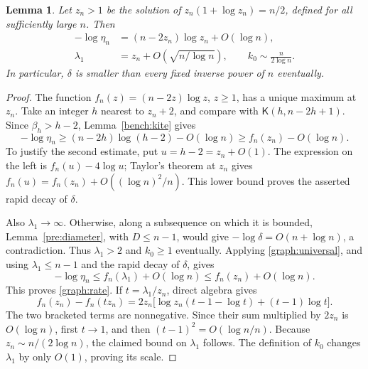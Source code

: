 \documentclass[11pt,a4paper]{article}
\numberwithin{equation}{section}
\newtheorem{lemma}[theorem]{Lemma}
\theoremstyle{definition}
\theoremstyle{remark}
\newcommand{\Kite}{\mathsf{K}}
\begin{document}
\begin{lemma}\label{graph:scale}
Let $z_n>1$ be the solution of $z_n(1+\log z_n)=n/2$, defined for
all sufficiently large $n$. Then
\begin{align}
 -\log\eta_n&=(n-2z_n)\log z_n+O(\log n),\label{graph:rate}\\
 \lambda_1&=z_n+O\!\left(\sqrt{n/\log n}\right),
 \qquad k_0\sim\frac{n}{2\log n}.\label{graph:scale-eq}
\end{align}
In particular, $\delta$ is smaller than every fixed inverse power of $n$
eventually.
\end{lemma}
\begin{proof}
The function $f_n(z)=(n-2z)\log z$, $z\ge1$, has a unique maximum at
$z_n$. Take an integer $h$ nearest to $z_n+2$, and compare with
$\Kite(h,n-2h+1)$. Since $\beta_h>h-2$, Lemma~\ref{bench:kite} gives
\[
 -\log\eta_n\ge(n-2h)\log(h-2)-O(\log n)
 \ge f_n(z_n)-O(\log n).
\]
To justify the second estimate, put $u=h-2=z_n+O(1)$.
The expression on the left is $f_n(u)-4\log u$; Taylor's theorem at
$z_n$ gives $f_n(u)=f_n(z_n)+O((\log n)^2/n)$.
This lower bound proves the asserted rapid decay of $\delta$.

Also $\lambda_1\to\infty$. Otherwise, along a subsequence on which it
is bounded, Lemma~\ref{pre:diameter}, with $D\le n-1$, would give
$-\log\delta=O(n+\log n)$, a contradiction. Thus $\lambda_1>2$ and
$k_0\ge1$ eventually. Applying \eqref{graph:universal}, and using
$\lambda_1\le n-1$ and the rapid decay of $\delta$, gives
\[
 -\log\eta_n\le f_n(\lambda_1)+O(\log n)
 \le f_n(z_n)+O(\log n).
\]
This proves \eqref{graph:rate}. If $t=\lambda_1/z_n$, direct algebra gives
\[
 f_n(z_n)-f_n(tz_n)
 =2z_n\bigl[\log z_n(t-1-\log t)+(t-1)\log t\bigr].
\]
The two bracketed terms are nonnegative. Since their sum multiplied by
$2z_n$ is $O(\log n)$, first $t\to1$, and then
$(t-1)^2=O(\log n/n)$. Because $z_n\sim n/(2\log n)$, the claimed
bound on $\lambda_1$ follows. The definition of $k_0$ changes
$\lambda_1$ by only $O(1)$, proving its scale.
\end{proof}
\end{document}
